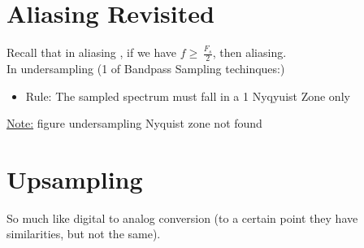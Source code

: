 


\section{Aliasing Revisited}

Recall that in aliasing , if we have $f \geq \, \displaystyle\frac{F_s}{2}$, then aliasing.\\

In undersampling (1 of Bandpass Sampling techinques:)

\begin{itemize}
    \item Rule: The sampled spectrum must fall in a 1 Nyqyuist Zone only
\end{itemize}



\underline{Note:} figure undersampling Nyquist zone not found


\section{Upsampling}

So much like digital to analog conversion (to a certain point they have similarities, but not the same).